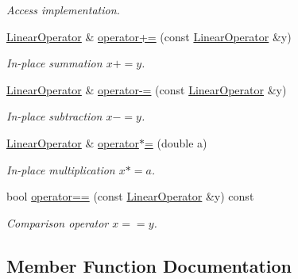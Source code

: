 \begin{DoxyCompactItemize}
\begin{DoxyCompactList}\small\item\em Access implementation. \end{DoxyCompactList}\item 
\hyperlink{structSpacy_1_1Scalar_1_1LinearOperator}{Linear\+Operator} \& \hyperlink{classSpacy_1_1AddArithmeticOperators_afad1d01e1e8c6f75290ac46d9b047ea8}{operator+=} (const \hyperlink{structSpacy_1_1Scalar_1_1LinearOperator}{Linear\+Operator} \&y)
\begin{DoxyCompactList}\small\item\em In-\/place summation $ x+=y$. \end{DoxyCompactList}\item 
\hyperlink{structSpacy_1_1Scalar_1_1LinearOperator}{Linear\+Operator} \& \hyperlink{classSpacy_1_1AddArithmeticOperators_a9fa91e177d13203cfe8cfa991c64ca36}{operator-\/=} (const \hyperlink{structSpacy_1_1Scalar_1_1LinearOperator}{Linear\+Operator} \&y)
\begin{DoxyCompactList}\small\item\em In-\/place subtraction $ x-=y$. \end{DoxyCompactList}\item 
\hyperlink{structSpacy_1_1Scalar_1_1LinearOperator}{Linear\+Operator} \& \hyperlink{classSpacy_1_1AddArithmeticOperators_a1d3db95b24fd2bc1de712c9e04c47e2f}{operator$\ast$=} (double a)
\begin{DoxyCompactList}\small\item\em In-\/place multiplication $ x*=a$. \end{DoxyCompactList}\item 
bool \hyperlink{classSpacy_1_1AddArithmeticOperators_a5ff1909f49f4a705d69663dc2d4b6316}{operator==} (const \hyperlink{structSpacy_1_1Scalar_1_1LinearOperator}{Linear\+Operator} \&y) const
\begin{DoxyCompactList}\small\item\em Comparison operator $ x==y$. \end{DoxyCompactList}\end{DoxyCompactItemize}


\subsection{Member Function Documentation}
\hypertarget{classSpacy_1_1AddArithmeticOperators_afad1d01e1e8c6f75290ac46d9b047ea8}{}
